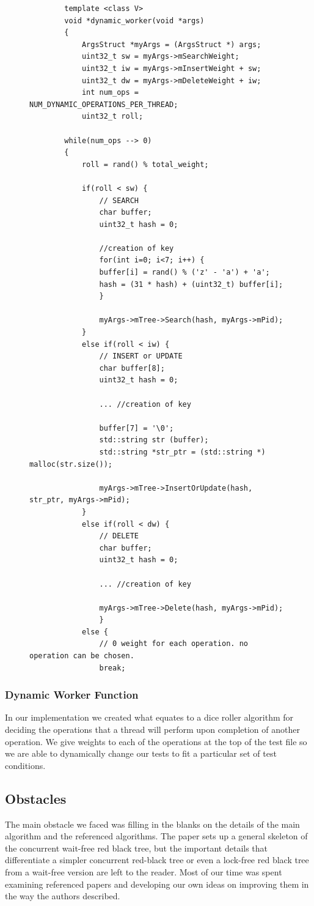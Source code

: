 \documentclass[letterpaper, 10 pt, conference]{ieeeconf}
\begin{document}
\begin{figure}
	\begin{lstlisting}
		template <class V>
		void *dynamic_worker(void *args)
		{
			ArgsStruct *myArgs = (ArgsStruct *) args;
			uint32_t sw = myArgs->mSearchWeight;
			uint32_t iw = myArgs->mInsertWeight + sw;
			uint32_t dw = myArgs->mDeleteWeight + iw;
			int num_ops = NUM_DYNAMIC_OPERATIONS_PER_THREAD;
			uint32_t roll;
		
		while(num_ops --> 0)
		{
			roll = rand() % total_weight;
		
			if(roll < sw) {
				// SEARCH
				char buffer;
				uint32_t hash = 0;
				
				//creation of key
				for(int i=0; i<7; i++) {
				buffer[i] = rand() % ('z' - 'a') + 'a';
				hash = (31 * hash) + (uint32_t) buffer[i];
				}
				
				myArgs->mTree->Search(hash, myArgs->mPid);
			}
			else if(roll < iw) {
				// INSERT or UPDATE
				char buffer[8];
				uint32_t hash = 0;
				
				... //creation of key
			
				buffer[7] = '\0';
				std::string str (buffer);
				std::string *str_ptr = (std::string *) malloc(str.size());
			
				myArgs->mTree->InsertOrUpdate(hash, str_ptr, myArgs->mPid);
			}
			else if(roll < dw) {
				// DELETE
				char buffer;
				uint32_t hash = 0;
				
				... //creation of key
				
				myArgs->mTree->Delete(hash, myArgs->mPid);
				}
			else {
				// 0 weight for each operation. no operation can be chosen.
				break;
	\end{lstlisting}
\end{figure}

\subsubsection{Dynamic Worker Function}
In our implementation we created what equates to a dice roller algorithm for deciding the operations that a thread will perform upon completion of another operation. We give weights to each of the operations at the top of the test file so we are able to dynamically change our tests to fit a particular set of test conditions.

\subsection{Obstacles}
The main obstacle we faced was filling in the blanks on the details of the main algorithm and the referenced algorithms. The paper sets up a general skeleton of the concurrent wait-free red black tree, but the important details that differentiate a simpler concurrent red-black tree or even a lock-free red black tree from a wait-free version are left to the reader. Most of our time was spent examining referenced papers and developing our own ideas on improving them in the way the authors described.
\end{document}
